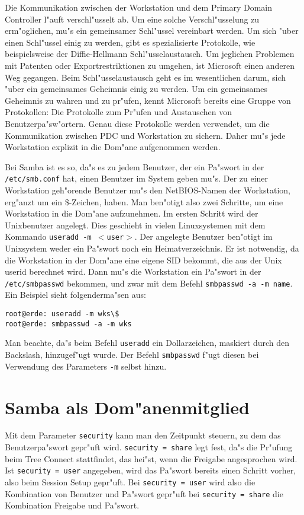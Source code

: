 \documentclass{scrartcl}
\newcommand{\prog}{\texttt}
\newcommand{\param}{\texttt}
\newcommand{\datei}{\texttt}
\begin{document}
Die Kommunikation zwischen der Workstation und dem Primary Domain
Controller l"auft verschl"usselt ab. Um eine solche Verschl"usselung
zu erm"oglichen, mu"s ein gemeinsamer Schl"ussel vereinbart werden. Um
sich "uber einen Schl"ussel einig zu werden, gibt es spezialisierte
Protokolle, wie beispielsweise der Diffie-Hellmann
Schl"usselaustausch. Um jeglichen Problemen mit Patenten oder
Exportrestriktionen zu umgehen, ist Microsoft einen anderen Weg
gegangen.  Beim Schl"usselaustausch geht es im wesentlichen darum,
sich "uber ein gemeinsames Geheimnis einig zu werden. Um ein
gemeinsames Geheimnis zu wahren und zu pr"ufen, kennt Microsoft
bereits eine Gruppe von Protokollen: Die Protokolle zum Pr"ufen und
Austauschen von Benutzerpa"sw"ortern. Genau diese Protokolle werden
verwendet, um die Kommunikation zwischen PDC und Workstation zu
sichern. Daher mu"s jede Workstation explizit in die Dom"ane
aufgenommen werden.

Bei Samba ist es so, da"s es zu jedem Benutzer, der ein Pa"swort in
der \datei{/etc/smb.conf} hat, einen Benutzer im System geben mu"s.
Der zu einer Workstation geh"orende Benutzer mu"s den NetBIOS-Namen
der Workstation, erg"anzt um ein \$-Zeichen, haben. Man ben"otigt also
zwei Schritte, um eine Workstation in die Dom"ane aufzunehmen. Im
ersten Schritt wird der Unixbenutzer angelegt. Dies geschieht in
vielen Linuxsystemen mit dem Kommando \texttt{useradd -m $<$user$>$}.
Der angelegte Benutzer ben"otigt im Unixsystem weder ein Pa"swort noch
ein Heimatverzeichnis. Er ist notwendig, da die Workstation in der
Dom"ane eine eigene SID bekommt, die aus der Unix userid berechnet
wird. Dann mu"s die Workstation ein Pa"swort in der
\datei{/etc/smbpasswd} bekommen, und zwar mit dem Befehl
\texttt{smbpasswd -a -m name}. Ein Beispiel sieht folgenderma"sen aus:

\begin{verbatim}
root@erde: useradd -m wks\$
root@erde: smbpasswd -a -m wks
\end{verbatim}

Man beachte, da"s beim Befehl \texttt{useradd} ein Dollarzeichen,
maskiert durch den Backslash, hinzugef"ugt wurde. Der Befehl
\prog{smbpasswd} f"ugt diesen bei Verwendung des Parameters \prog{-m}
selbst hinzu.

\section{Samba als Dom"anenmitglied}

Mit dem Parameter \param{security} kann man den Zeitpunkt steuern, zu
dem das Benutzerpa"swort gepr"uft wird. \param{security = share} legt
fest, da"s die Pr"ufung beim Tree Connect stattfindet, das hei"st,
wenn die Freigabe angesprochen wird. Ist \param{security = user}
angegeben, wird das Pa"swort bereits einen Schritt vorher, also beim
Session Setup gepr"uft. Bei \param{security = user} wird also die
Kombination von Benutzer und Pa"swort gepr"uft bei \param{security =
  share} die Kombination Freigabe und Pa"swort.
\end{document}

